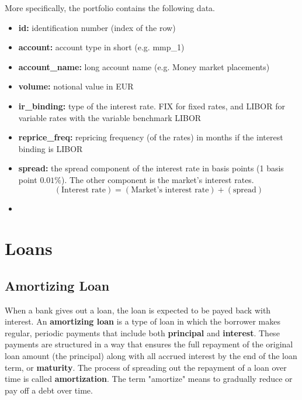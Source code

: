 \documentclass[11pt]{article}
\begin{document}
More specifically, the portfolio contains the following data. 
\begin{itemize}
	\item \textbf{id:} identification number (index of the row)
	\item \textbf{account:} account type in short (e.g. mmp\_1)
	\item \textbf{account\_name:} long account name (e.g. Money market placements)
	\item \textbf{volume:} notional value in EUR
	\item \textbf{ir\_binding:} type of the interest rate. FIX for fixed rates, and LIBOR for variable rates with the variable benchmark LIBOR
	\item \textbf{reprice\_freq:} repricing frequency (of the rates) in months if the interest binding is LIBOR
	\item \textbf{spread:} the spread component of the interest rate in basis points (1 basis point $0.01\%$). The other component is the market's interest rates. $$(\text{Interest rate}) = (\text{Market's interest rate})+(\text{spread})$$
	\item 
\end{itemize}

    


\section{Loans}


\subsection{Amortizing Loan}

When a bank gives out a loan, the loan is expected to be payed back with interest. An \textbf{amortizing loan} is a type of loan in which the borrower makes regular, periodic payments that include both \textbf{principal} and \textbf{interest}. These payments are structured in a way that ensures the full repayment of the original loan amount (the principal) along with all accrued interest by the end of the loan term, or \textbf{maturity}. The process of spreading out the repayment of a loan over time is called \textbf{amortization}. The term "amortize" means to gradually reduce or pay off a debt over time.\\
\end{document}
